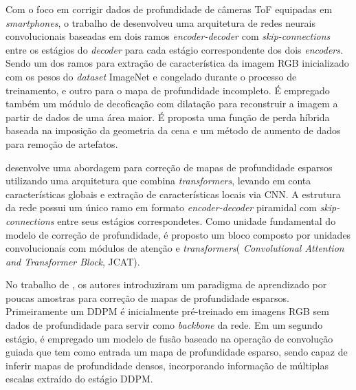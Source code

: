 Com o foco em corrigir dados de profundidade de câmeras ToF equipadas em \textit{smartphones}, o trabalho de  desenvolveu uma arquitetura de redes neurais convolucionais baseadas em dois ramos \textit{encoder-decoder} com \textit{skip-connections} entre os estágios do \textit{decoder} para cada estágio correspondente dos dois \textit{encoders}. Sendo um dos ramos para extração de característica da imagem RGB inicializado com os pesos do \textit{dataset} ImageNet e congelado durante o processo de treinamento, e outro para o mapa de profundidade incompleto. É empregado também um módulo de decoficação com dilatação para reconstruir a imagem a partir de dados de uma área maior. É proposta uma função de perda híbrida baseada na imposição da geometria da cena e um método de aumento de dados para remoção de artefatos.


 desenvolve uma abordagem para correção de mapas de profundidade esparsos utilizando uma arquitetura que combina \textit{transformers}, levando em conta características globais e extração de características locais via CNN. A estrutura da rede possui um único ramo em formato \textit{encoder-decoder} piramidal com \textit{skip-connections} entre seus estágios correspondetes. Como unidade fundamental do modelo de correção de profundidade, é proposto um bloco composto por unidades convolucionais com módulos de atenção e \textit{transformers}( \textit{Convolutional Attention and Transformer Block}, JCAT).




No trabalho de , os autores introduziram um paradigma de aprendizado por poucas amostras para correção de mapas de profundidade esparsos. Primeiramente um DDPM é inicialmente pré-treinado em imagens RGB sem dados de profundidade para servir como \textit{backbone} da rede. Em um segundo estágio, é empregado um modelo de fusão baseado na operação de convolução guiada que tem como entrada um mapa de profundidade esparso, sendo capaz de inferir mapas de profundidade densos, incorporando informação de múltiplas escalas extraído do estágio DDPM.
